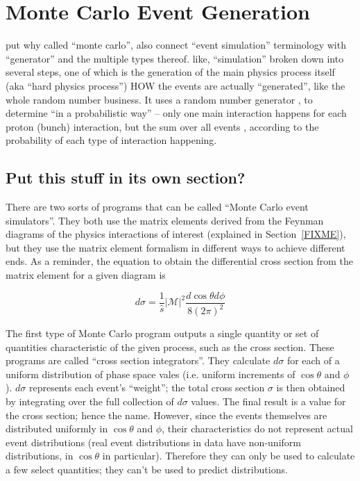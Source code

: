 \section{Monte Carlo Event Generation}
\label{sim:MC}
put why called ``monte carlo'', 
also connect ``event simulation'' terminology 
with ``generator'' and the multiple types thereof.
like, ``simulation'' broken down into several steps, 
one of which is the generation of the main 
physics process itself (aka ``hard physics process'')
HOW the events are actually ``generated'', 
like the whole random number business. 
It uses a random number generator , 
to determine ``in a probabilistic way'' -- 
only one main interaction happens 
for each proton (bunch) interaction, 
but the sum over all events ,
according to the probability of each type of 
interaction happening.  



\subsection{Put this stuff in its own section?}
\label{sim:MCexplain}




There are two sorts of programs that can be called 
``Monte Carlo event simulators''.  
They both use the matrix elements derived from 
the Feynman diagrams of the physics interactions of interest 
(explained in Section~\ref{FIXME}), %
but they use the matrix element formalism 
in different ways to achieve different ends.  
As a reminder, the equation to obtain the 
differential cross section %
from the matrix element for a given diagram is 

\[
d\sigma = \frac{1}{\hat{s}}|\mathcal{M}|^2 \frac{d \cos \theta d\phi}{8(2\pi)^2}
\]

The first type of Monte Carlo program outputs 
a single quantity or set of quantities characteristic 
of the given process, 
such as the cross section.  
These programs are called ``cross section integrators''.  
They calculate 
$d\sigma$ for each of a uniform distribution of 
phase space vales (i.e. uniform increments 
of $\cos\theta$ and $\phi$).  
$d\sigma$ represents each event's ``weight''; 
the total cross section $\sigma$ is then obtained 
by integrating over the full collection of $d\sigma$ values.  
The final result is a value for the cross section; 
hence the name.  
However, since the events themselves are distributed 
uniformly in $\cos\theta$ and $\phi$, 
their characteristics 
do not represent actual event distributions 
(real event distributions in data have 
non-uniform distributions, 
in $\cos\theta$ in particular).  
Therefore they can only be used to calculate 
a few select quantities; 
they can't be used to predict distributions.  

